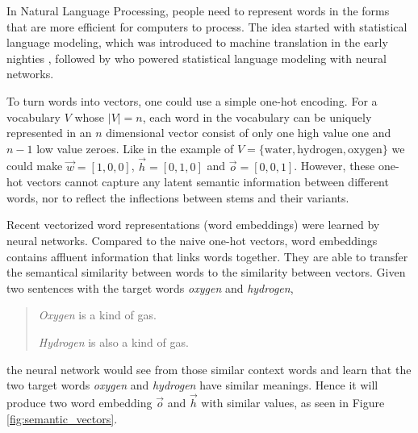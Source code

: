 \documentclass[thesis,fonts=libertine]{cluu}
\begin{document}
In Natural Language Processing, people need to represent words in the forms that are more efficient for computers to process. The idea started with statistical language modeling, which was introduced to machine translation in the early nighties \parencite{brown-etal-1990-statistical}, followed by \textcite{bengio2003neural} who powered statistical language modeling with neural networks.

To turn words into vectors, one could use a simple one-hot encoding. For a vocabulary $V$ whose $|V|=n$, each word in the vocabulary can be uniquely represented in an $n$ dimensional vector consist of only one high value one and $n-1$ low value zeroes. Like in the example of $V=\{\text{water}, \text{hydrogen}, \text{oxygen}\}$ we could make $\vec{w}=[1, 0, 0]$, $\vec{h}=[0, 1, 0]$ and $\vec{o}=[0, 0, 1]$. However, these one-hot vectors cannot capture any latent semantic information between different words, nor to reflect the inflections between stems and their variants.

Recent vectorized word representations (word embeddings) were learned by neural networks. Compared to the naive one-hot vectors, word embeddings contains affluent information that links words together. They are able to transfer the semantical similarity between words to the similarity between vectors. Given two sentences with the target words \textit{oxygen} and \textit{hydrogen},

\begin{quotation}
  \textit{Oxygen} is a kind of gas.

  \textit{Hydrogen} is also a kind of gas.
\end{quotation}

\noindent the neural network would see from those similar context words and learn that the two target words \textit{oxygen} and \textit{hydrogen} have similar meanings. Hence it will produce two word embedding $\vec{o}$ and $\vec{h}$ with similar values, as seen in Figure \ref{fig:semantic_vectors}.
\end{document}
